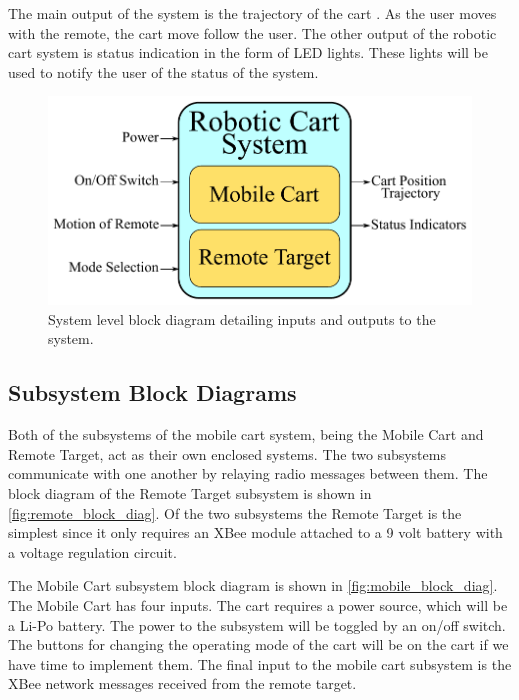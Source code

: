 \documentclass[letterpaper,12pt]{article}   %
\begin{document}
\vspace*{12pt}
\noindent
The main output of the system is the trajectory of the cart .
As the user moves with the remote, the cart  move
 follow the user. The other output of the robotic cart system is status indication in the form of LED lights. These lights will be used to notify the user of the status of the system.

\begin{figure}[!h]
    \centering
    \includegraphics[scale=0.9]{figs/system_block_diagram_2}
    \caption{System level block diagram detailing inputs and outputs to the
       system.}
	\label{fig:sys_block_diag}
\end{figure}

\subsection{Subsystem Block Diagrams}
Both of the subsystems of the mobile cart system, being the Mobile Cart and Remote Target, act as their own enclosed systems. The two subsystems communicate with one another by relaying radio messages between them. The block diagram of the Remote Target subsystem is shown in \autoref{fig:remote_block_diag}. Of the two subsystems the Remote Target is the simplest since it only requires an XBee module attached to a 9 volt battery with a voltage regulation circuit.

\vspace*{12pt}
\noindent
The Mobile Cart subsystem block diagram is shown in
\autoref{fig:mobile_block_diag}. The Mobile Cart has four inputs. The cart
requires a power source, which will be a Li-Po battery. The power to the
subsystem will be toggled by an on/off switch. The buttons for changing the
operating mode of the cart will be on the cart if we have time to implement
them. The final input to the mobile cart subsystem is the XBee network messages
received from the remote target.
\end{document}
